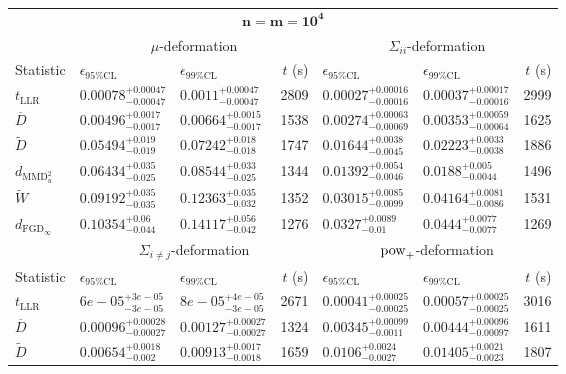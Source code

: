 \begin{tabular}{l|llr|llr}
	\toprule
	\multicolumn{7}{c}{$\mathbf{n=m=10^{4}}$} \\
	\multicolumn{1}{c}{} & \multicolumn{3}{c}{$\mu$-deformation} & \multicolumn{3}{c}{$\Sigma_{ii}$-deformation} \\
	Statistic & $\epsilon_{95\%\mathrm{CL}}$ & $\epsilon_{99\%\mathrm{CL}}$ & $t$ (s) & $\epsilon_{95\%\mathrm{CL}}$ & $\epsilon_{99\%\mathrm{CL}}$ & $t$ (s) \\
	\midrule
	$t_{\mathrm{LLR}}$ & $0.00078_{-0.00047}^{+0.00047}$ & $0.0011_{-0.00047}^{+0.00047}$ & 2809 & $0.00027_{-0.00016}^{+0.00016}$ & $0.00037_{-0.00016}^{+0.00017}$ & 2999 \\
	$\overline{D}$ & $0.00496_{-0.0017}^{+0.0017}$ & $0.00664_{-0.0017}^{+0.0015}$ & 1538 & $0.00274_{-0.00069}^{+0.00063}$ & $0.00353_{-0.00064}^{+0.00059}$ & 1625 \\
	$\widetilde{D}$ & $0.05494_{-0.019}^{+0.019}$ & $0.07242_{-0.018}^{+0.018}$ & 1747 & $0.01644_{-0.0045}^{+0.0038}$ & $0.02223_{-0.0038}^{+0.0033}$ & 1886 \\
	$d_{\mathrm{MMD}^{2}_{u}}$ & $0.06434_{-0.025}^{+0.035}$ & $0.08544_{-0.025}^{+0.033}$ & 1344 & $0.01392_{-0.0046}^{+0.0054}$ & $0.0188_{-0.0044}^{+0.005}$ & 1496 \\
	$\widetilde{W}$ & $0.09192_{-0.035}^{+0.035}$ & $0.12363_{-0.032}^{+0.035}$ & 1352 & $0.03015_{-0.0099}^{+0.0085}$ & $0.04164_{-0.0086}^{+0.0081}$ & 1531 \\
	$d_{\mathrm{FGD}_{\infty}}$ & $0.10354_{-0.044}^{+0.06}$ & $0.14117_{-0.042}^{+0.056}$ & 1276 & $0.0327_{-0.01}^{+0.0089}$ & $0.0444_{-0.0077}^{+0.0077}$ & 1269 \\
	\toprule
	\multicolumn{1}{c}{} & \multicolumn{3}{c}{$\Sigma_{i\neq j}$-deformation} & \multicolumn{3}{c}{$\rm{pow}_{+}$-deformation} \\
	Statistic & $\epsilon_{95\%\mathrm{CL}}$ & $\epsilon_{99\%\mathrm{CL}}$ & $t$ (s) & $\epsilon_{95\%\mathrm{CL}}$ & $\epsilon_{99\%\mathrm{CL}}$ & $t$ (s) \\
	\midrule
	$t_{\mathrm{LLR}}$ & $6e-05_{-3e-05}^{+3e-05}$ & $8e-05_{-3e-05}^{+4e-05}$ & 2671 & $0.00041_{-0.00025}^{+0.00025}$ & $0.00057_{-0.00025}^{+0.00025}$ & 3016 \\
	$\overline{D}$ & $0.00096_{-0.00027}^{+0.00028}$ & $0.00127_{-0.00027}^{+0.00027}$ & 1324 & $0.00345_{-0.0011}^{+0.00099}$ & $0.00444_{-0.00097}^{+0.00096}$ & 1611 \\
	$\widetilde{D}$ & $0.00654_{-0.002}^{+0.0018}$ & $0.00913_{-0.0018}^{+0.0017}$ & 1659 & $0.0106_{-0.0027}^{+0.0024}$ & $0.01405_{-0.0023}^{+0.0021}$ & 1807 \\

\end{tabular}
